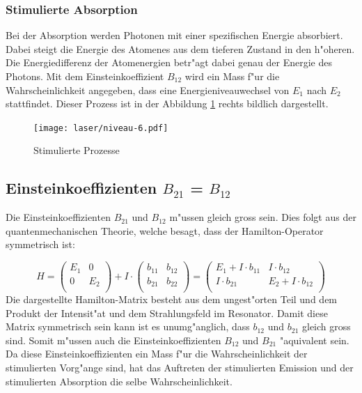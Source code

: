 \begin{refsection}
\subsubsection{Stimulierte Absorption}
Bei der Absorption werden Photonen mit einer spezifischen Energie absorbiert.
Dabei steigt die Energie des Atomenes aus dem tieferen Zustand in den
h"oheren.
Die Energiedifferenz der Atomenergien betr"agt dabei genau der Energie des
Photons.
Mit dem Einsteinkoeffizient $B_{12}$ wird ein Mass f"ur die
Wahrscheinlichkeit angegeben, dass eine Energieniveauwechsel von $E_1$ nach
$E_2$ stattfindet.
Dieser Prozess ist in der Abbildung \ref{Stimulierte Prozesse} rechts bildlich
dargestellt.

\begin{figure}
\centering
\texttt{[image: laser/niveau-6.pdf]}
\caption{Stimulierte Prozesse}
\label{Stimulierte Prozesse}
\end{figure}


\subsection{Einsteinkoeffizienten $B_{21}$ = $B_{12}$}
\label{B21=B12}
Die Einsteinkoeffizienten $B_{21}$ und $B_{12}$ m"ussen gleich gross sein.
Dies folgt aus der quantenmechanischen Theorie, welche besagt, dass der
Hamilton-Operator symmetrisch ist:

\[
H =\begin{pmatrix}
E_1 & 0  \\
0   & E_2 \\
\end{pmatrix}
+ I\cdot \begin{pmatrix}
b_{11} & b_{12}  \\
b_{21} & b_{22} \\
\end{pmatrix}
=\begin{pmatrix}
E_1+ I\cdot b_{11} & I\cdot b_{12}  \\
I\cdot b_{21} & E_2+I\cdot b_{12} \\
\end{pmatrix}
\]
Die dargestellte Hamilton-Matrix besteht aus dem ungest"orten Teil und 
dem Produkt der Intensit"at und dem Strahlungsfeld im Resonator.
Damit diese Matrix symmetrisch sein kann ist es unumg"anglich, dass $b_{12}$
und $b_{21}$ gleich gross sind.
Somit m"ussen auch die Einsteinkoeffizienten $B_{12}$ und $B_{21}$ "aquivalent
sein.
Da diese Einsteinkoeffizienten ein Mass f"ur die Wahrscheinlichkeit der
stimulierten Vorg"ange sind, hat das Auftreten der stimulierten Emission und
der stimulierten Absorption die selbe Wahrscheinlichkeit.


\end{refsection}
